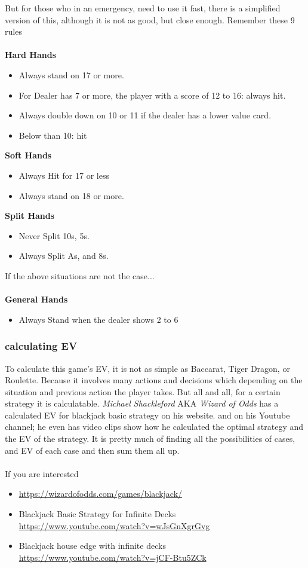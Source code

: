 \documentclass{article}
\begin{document}
But for those who in an emergency, need to use it fast, there is a simplified version of this, although it is not as good, but close enough.  Remember these 9 rules\\
\\
\textbf{Hard Hands}
\begin{itemize}
\item Always stand on 17 or more.
\item For Dealer has 7 or more, the player with a score of 12 to 16: always hit.
\item Always double down on 10 or 11 if the dealer has a lower value card.
\item Below than 10: hit
\end{itemize}
\textbf{Soft Hands}
\begin{itemize}
\item Always Hit for 17 or less
\item Always stand on 18 or more.
\end{itemize}
\textbf{Split Hands}
\begin{itemize}
\item Never Split 10s, 5s.
\item Always Split As, and 8s.
\end{itemize}
If the above situations are not the case...\\
\\
\textbf{General Hands}
\begin{itemize}
\item Always Stand when the dealer shows 2 to 6
\end{itemize}

\subsubsection{calculating EV}

To calculate this game's EV, it is not as simple as Baccarat, Tiger Dragon, or Roulette.  Because it involves many actions and decisions which depending on the situation and previous action the player takes.  But all and all, for a certain strategy it is calculatable.  \emph{Michael Shackleford} AKA \emph{Wizard of Odds} has a calculated EV for blackjack basic strategy on his website.  and on his Youtube channel; he even has video clips show how he calculated the optimal strategy and the EV of the strategy.  It is pretty much of finding all the possibilities of cases, and EV of each case and then sum them all up.\\
\\
If you are interested
\begin{itemize}
\item \url{https://wizardofodds.com/games/blackjack/}
\item Blackjack Basic Strategy for Infinite Decks\\ \url{https://www.youtube.com/watch?v=wJsGnXgrGvg}
\item Blackjack house edge with infinite decks\\ \url{https://www.youtube.com/watch?v=jCF-Btu5ZCk}
\end{itemize}
\end{document}
